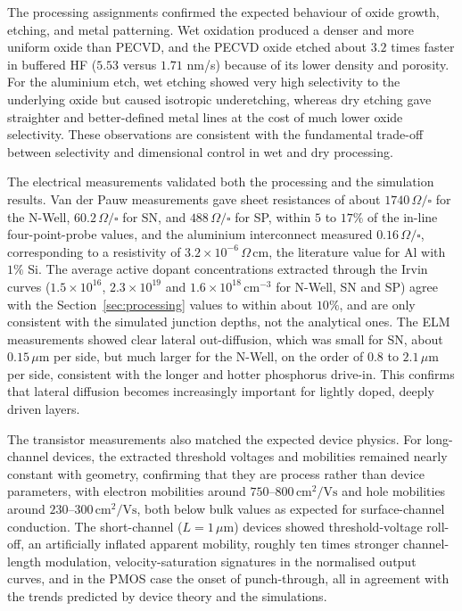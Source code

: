 The processing assignments confirmed the expected behaviour of oxide growth, etching, and metal patterning. Wet oxidation produced a denser and more uniform oxide than PECVD, and the PECVD oxide etched about $3.2$ times faster in buffered HF ($5.53$ versus $1.71$ nm/s) because of its lower density and porosity. For the aluminium etch, wet etching showed very high selectivity to the underlying oxide but caused isotropic underetching, whereas dry etching gave straighter and better-defined metal lines at the cost of much lower oxide selectivity. These observations are consistent with the fundamental trade-off between selectivity and dimensional control in wet and dry processing.

The electrical measurements validated both the processing and the simulation results. Van der Pauw measurements gave sheet resistances of about $1740\,\Omega/\square$ for the N-Well, $60.2\,\Omega/\square$ for SN, and $488\,\Omega/\square$ for SP, within $5$ to $17\%$ of the in-line four-point-probe values, and the aluminium interconnect measured $0.16\,\Omega/\square$, corresponding to a resistivity of $3.2\times10^{-6}\,\Omega\,\text{cm}$, the literature value for Al with $1\%$ Si. The average active dopant concentrations extracted through the Irvin curves ($1.5\times10^{16}$, $2.3\times10^{19}$ and $1.6\times10^{18}\,\text{cm}^{-3}$ for N-Well, SN and SP) agree with the Section~\ref{sec:processing} values to within about $10\%$, and are only consistent with the simulated junction depths, not the analytical ones. The ELM measurements showed clear lateral out-diffusion, which was small for SN, about $0.15\,\mu\text{m}$ per side, but much larger for the N-Well, on the order of $0.8$ to $2.1\,\mu\text{m}$ per side, consistent with the longer and hotter phosphorus drive-in. This confirms that lateral diffusion becomes increasingly important for lightly doped, deeply driven layers.

The transistor measurements also matched the expected device physics. For long-channel devices, the extracted threshold voltages and mobilities remained nearly constant with geometry, confirming that they are process rather than device parameters, with electron mobilities around $750$--$800\,\text{cm}^2/\text{Vs}$ and hole mobilities around $230$--$300\,\text{cm}^2/\text{Vs}$, both below bulk values as expected for surface-channel conduction. The short-channel ($L = 1\,\mu\text{m}$) devices showed threshold-voltage roll-off, an artificially inflated apparent mobility, roughly ten times stronger channel-length modulation, velocity-saturation signatures in the normalised output curves, and in the PMOS case the onset of punch-through, all in agreement with the trends predicted by device theory and the simulations.


